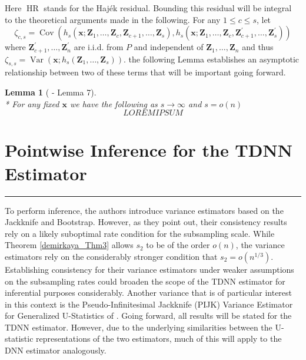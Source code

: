 \documentclass[letterpaper,10pt]{article}
\numberwithin{equation}{section}
\numberwithin{thm}{section}
\newtheorem{lem}{Lemma}
\numberwithin{lem}{section}
\numberwithin{cor}{section}
\newcommand{\1}{\mathbb{1}}
\begin{document}
Here $\operatorname{HR}$ stands for the Haj\'ek residual.
Bounding this residual will be integral to the theoretical arguments made in the following.
For any $1 \leq c \leq s$, let
\begin{equation}
	\zeta_{c,s}
	= \operatorname{Cov}\left(h_s\left(\mathbf{x}; \mathbf{Z}_1, \ldots, \mathbf{Z}_c, \mathbf{Z}_{c+1}, \ldots, \mathbf{Z}_s\right),
	h_s\left(\mathbf{x}; \mathbf{Z}_1, \ldots, \mathbf{Z}_c, \mathbf{Z}_{c+1}^{\prime}, \ldots, \mathbf{Z}_s^{\prime}\right)\right)
\end{equation}
where $\mathbf{Z}_{c+1}^{\prime}, \ldots, \mathbf{Z}_n^{\prime}$ are i.i.d. from $P$ and independent of $\mathbf{Z}_1, \ldots, \mathbf{Z}_n$ and thus
$\zeta_{s,s} = \operatorname{Var}\left(\mathbf{x}; h_s\left(\mathbf{Z}_1, \ldots, \mathbf{Z}_s\right)\right).$
the following Lemma establishes an asymptotic relationship between two of these terms that will be important going forward.

	{\color{red}
		\begin{lem}[\citet{demirkaya_optimal_2024} - Lemma 7]\label{Cov_TDNN_k}\mbox{}\\*
			For any fixed $\mathbf{x}$ we have the following as $s \rightarrow \infty$ and $s = o(n)$
			\begin{equation}
				LOREM IPSUM
			\end{equation}
		\end{lem}
	}

\newpage
\section{Pointwise Inference for the TDNN Estimator}\label{PW_Inf}
\hrule
To perform inference, the authors introduce variance estimators based on the Jackknife and Bootstrap.
However, as they point out, their consistency results rely on a likely suboptimal rate condition for the subsampling scale.
While Theorem \ref{demirkaya_Thm3} allows $s_2$ to be of the order $o(n)$, the variance estimators rely on the considerably stronger condition that $s_2 = o(n^{1/3})$.
Establishing consistency for their variance estimators under weaker assumptions on the subsampling rates could broaden the scope of the TDNN estimator for inferential purposes considerably.
Another variance that is of particular interest in this context is the Pseudo-Infinitesimal Jackknife (PIJK) Variance Estimator for Generalized U-Statistics of \citet{peng_bias_2021}.
Going forward, all results will be stated for the TDNN estimator.
However, due to the underlying similarities between the U-statistic representations of the two estimators, much of this will apply to the DNN estimator analogously.
\end{document}
